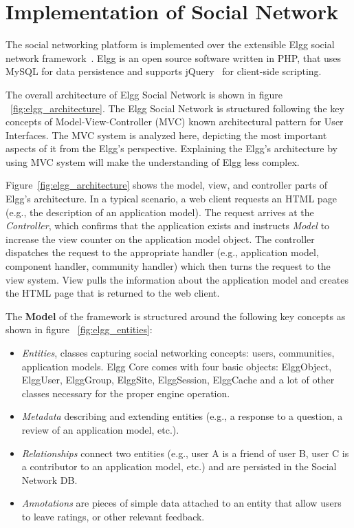 \section{Implementation of Social Network}
\label{sec:implementaion_of_social_netowrk}
The social networking platform is implemented over the extensible Elgg social network framework~\cite{elgg_url}.  Elgg is an open source software written in PHP, that uses MySQL for data persistence and supports jQuery~\cite{jquery_url} for client-side scripting.  

The overall architecture of Elgg Social Network is shown in figure ~\ref{fig:elgg_architecture}. The Elgg Social Network is structured following the key concepts of Model-View-Controller (MVC) known architectural pattern for User Interfaces. The MVC system is analyzed here, depicting the most important aspects of it from the Elgg's perspective. Explaining the Elgg's architecture by using MVC system will make the understanding of Elgg less complex.

Figure~\ref{fig:elgg_architecture} shows the model, view, and controller parts of Elgg's architecture. In a typical scenario, a web client requests an HTML page (e.g., the description of an application model).  The request arrives at the \emph{Controller}, which confirms that the application exists and instructs \emph{Model} to increase the view counter on the application model object. The controller dispatches the request to the appropriate handler (e.g., application model, component handler, community handler) which then turns the request to the view system. View pulls the information about the application model and creates the HTML page that is returned to the web client.

The {\bf Model} of the framework is structured around the following key concepts as shown in figure ~\ref{fig:elgg_entities}:
\begin{itemize}
\item \emph{Entities}, classes capturing social networking concepts: users, communities, application models. Elgg Core comes with four basic objects: ElggObject, ElggUser, ElggGroup, ElggSite, ElggSession, ElggCache and a lot of other classes necessary for the proper engine operation.
\item \emph{Metadata} describing and extending entities (e.g., a response to a question, a review of an application model, etc.).
\item  \emph{Relationships} connect two entities (e.g., user A is a friend of user B, user C is a contributor to an application model, etc.) and are persisted in the Social Network DB.
\item \emph{Annotations} are pieces of simple data attached to an entity that allow users to leave ratings, or other relevant feedback.
\end{itemize}

